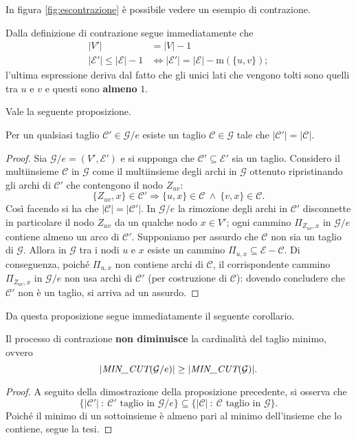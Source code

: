 In figura \ref{fig:escontrazione} è possibile vedere un esempio di contrazione.

Dalla definizione di contrazione segue immediatamente che
\begin{align*}
|V'|&=|V|-1 \\
|\mathcal{E'}|\leq |\mathcal{E}|-1 &\Leftrightarrow |\mathcal{E'}|=|\mathcal{E}|-\text{m}(\{u,v\});
\end{align*}
l'ultima espressione deriva dal fatto che gli unici lati che vengono tolti sono quelli tra $u$ e $v$ e questi sono \textbf{almeno} $1$.

Vale la seguente proposizione.
\begin{proposizione}
Per un qualsiasi taglio $\mathcal{C'}\in\mathcal{G}/e$ esiste un taglio $\mathcal{C}\in\mathcal{G}$ tale che $|\mathcal{C'}|=|\mathcal{C}|$.
\end{proposizione}
\begin{proof}
Sia $\mathcal{G}/e=(V',\mathcal{E'})$ e si supponga che $\mathcal{C'}\subseteq\mathcal{E'}$ sia un taglio. Considero il multiinsieme $\mathcal{C}$ in $\mathcal{G}$ come il multiinsieme degli archi in $\mathcal{G}$ ottenuto ripristinando gli archi di $\mathcal{C'}$ che contengono il nodo $Z_{uv}$:
\[
\{Z_{uv},x\}\in\mathcal{C'} \Rightarrow \{u,x\}\in\mathcal{C}\ \land\ \{v,x\}\in\mathcal{C}.
\]
Così facendo si ha che $|\mathcal{C}|=|\mathcal{C'}|$.
In $\mathcal{G}/e$ la rimozione degli archi in $\mathcal{C'}$ disconnette in particolare il nodo $Z_{uv}$ da un qualche nodo $x\in V'$; ogni cammino $\Pi_{Z_{uv},x}$ in $\mathcal{G}/e$ contiene almeno un arco di $\mathcal{C'}$.
Supponiamo per assurdo che $\mathcal{C}$ non sia un taglio di $\mathcal{G}$. Allora in $\mathcal{G}$ tra i nodi $u$ e $x$ esiste un cammino $\Pi_{u,x}\subseteq\mathcal{E}-\mathcal{C}$. Di conseguenza, poiché $\Pi_{u,x}$ non contiene archi di $\mathcal{C}$, il corrispondente cammino $\Pi_{Z_{uv},x}$ in $\mathcal{G}/e$ non usa archi di $\mathcal{C'}$ (per costruzione di $\mathcal{C}$): dovendo concludere che $\mathcal{C'}$ non è un taglio, si arriva ad un assurdo.
\end{proof}

Da questa proposizione segue immediatamente il seguente corollario.
\begin{corollario}
\label{corollario:mincut}
Il processo di contrazione \textbf{non diminuisce} la cardinalità del taglio minimo, ovvero
\[
|\emph{MIN\_CUT}(\mathcal{G}/e)|\geq|\emph{MIN\_CUT}(\mathcal{G})|.
\]
\end{corollario}
\begin{proof}
A seguito della dimostrazione della proposizione precedente, si osserva che
\[
\{|\mathcal{C'}|\ :\ \mathcal{C'} \text{ taglio in } \mathcal{G}/e\}\subseteq\{|\mathcal{C}|\ :\ \mathcal{C} \text{ taglio in } \mathcal{G}\}.
\]
Poiché il minimo di un sottoinsieme è almeno pari al minimo dell'insieme che lo contiene, segue la tesi.
\end{proof}

